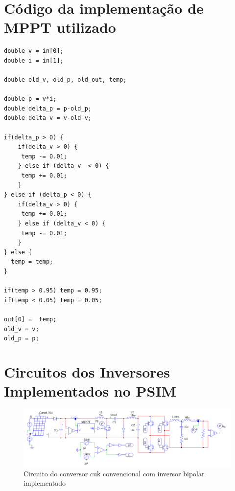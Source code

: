 \documentclass[
	12pt,				%
	openright,			%
	onseside,
	a4paper,			%
	english,			%
	french,				%
	spanish,			%
	brazil,				%
	]{abntex2}
\begin{document}
\begin{anexosenv}

\partanexos

\chapter{Código da implementação de MPPT utilizado}\label{anex:mppt_code}


\begin{lstlisting}
double v = in[0];
double i = in[1];

double old_v, old_p, old_out, temp;

double p = v*i;
double delta_p = p-old_p;
double delta_v = v-old_v;

if(delta_p > 0) {
    if(delta_v > 0) {
     temp -= 0.01;
    } else if (delta_v  < 0) {
     temp += 0.01;
    }
} else if (delta_p < 0) {
    if(delta_v > 0) {
     temp += 0.01;
    } else if (delta_v < 0) {
     temp -= 0.01;
    }
} else {
  temp = temp;
}

if(temp > 0.95) temp = 0.95;
if(temp < 0.05) temp = 0.05;

out[0] =  temp;
old_v = v;
old_p = p;
\end{lstlisting}

\chapter{Circuitos dos Inversores Implementados no PSIM} \label{anex:circ_images}

\begin{figure}
	\centering
	\includegraphics[width=\linewidth]{comp_conv_circ_clean}
	\caption{Circuito do conversor cuk convencional com inversor bipolar implementado}	


\end{figure}
\end{anexosenv}
\end{document}
